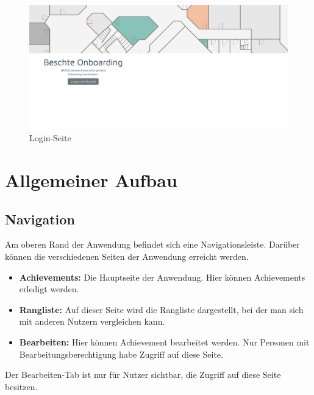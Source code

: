 \documentclass[11pt]{article}
\begin{document}
\begin{figure}[H]
    \centering
    \includegraphics[width=\textwidth]{application/login_page.png}
    \caption{Login-Seite}
\end{figure}

\section{Allgemeiner Aufbau}

\subsection{Navigation}
Am oberen Rand der Anwendung befindet sich eine Navigationsleiste. Darüber können die verschiedenen Seiten der Anwendung erreicht werden.
\begin{itemize}
    \item \textbf{Achievements: } Die Hauptseite der Anwendung. Hier können Achievements erledigt werden.
    \item \textbf{Rangliste: } Auf dieser Seite wird die Rangliste dargestellt, bei der man sich mit anderen Nutzern vergleichen kann.
    \item \textbf{Bearbeiten: } Hier können Achievement bearbeitet werden. Nur Personen mit Bearbeitungsberechtigung habe Zugriff auf diese Seite.
\end{itemize}
Der Bearbeiten-Tab ist nur für Nutzer sichtbar, die Zugriff auf diese Seite besitzen.
\end{document}
